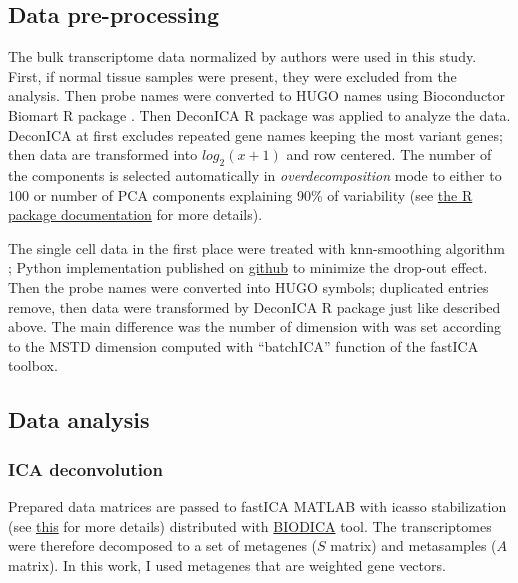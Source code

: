 \documentclass[12pt,]{book}
\theoremstyle{definition}
\theoremstyle{definition}
\theoremstyle{definition}
\theoremstyle{remark}
\begin{document}
\hypertarget{data-pre-processing}{%
\subsection{Data pre-processing}\label{data-pre-processing}}

The bulk transcriptome data normalized by authors were used in this
study. First, if normal tissue samples were present, they were excluded
from the analysis. Then probe names were converted to HUGO names using
Bioconductor Biomart R package \citep{Baker2012, Durinck2009}. Then
DeconICA R package \citep{Czerwinska2018} was applied to analyze the
data. DeconICA at first excludes repeated gene names keeping the most
variant genes; then data are transformed into \(log_2(x+1)\) and row
centered. The number of the components is selected automatically in
\emph{overdecomposition} mode to either to 100 or number of PCA
components explaining 90\% of variability (see
\href{https://urszulaczerwinska.github.io/DeconICA/DeconICA_introduction.html}{the
R package documentation} for more details).

The single cell data in the first place were treated with knn-smoothing
algorithm \citep{Wagner2018}; Python implementation published on
\href{https://github.com/yanailab/knn-smoothing}{github} to minimize the
drop-out effect. Then the probe names were converted into HUGO symbols;
duplicated entries remove, then data were transformed by DeconICA R
package just like described above. The main difference was the number of
dimension with was set according to the MSTD dimension computed with
``batchICA'' function of the fastICA toolbox.

\hypertarget{data-analysis}{%
\subsection{Data analysis}\label{data-analysis}}

\hypertarget{ica-deconvolution}{%
\subsubsection{ICA deconvolution}\label{ica-deconvolution}}

Prepared data matrices are passed to fastICA MATLAB with icasso
stabilization (see
\href{https://urszulaczerwinska.github.io/DeconICA/Icasso.html}{this}
for more details) distributed with
\href{https://github.com/LabBandSB/BIODICA}{BIODICA} tool. The
transcriptomes were therefore decomposed to a set of metagenes (\(S\)
matrix) and metasamples (\(A\) matrix). In this work, I used metagenes
that are weighted gene vectors.
\end{document}
